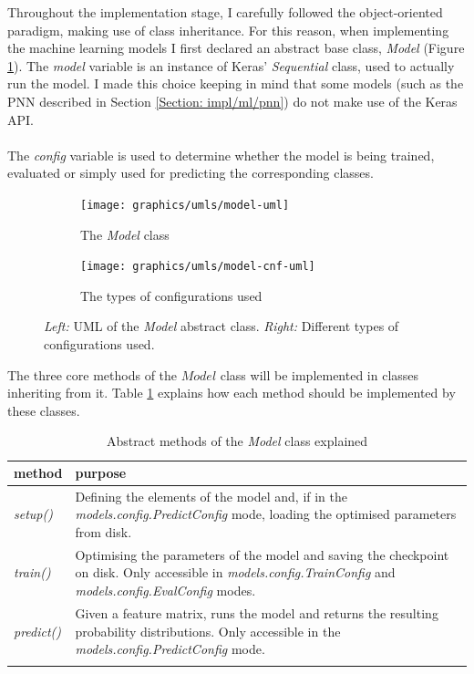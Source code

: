	Throughout the implementation stage, I carefully followed the object-oriented paradigm, making use of class inheritance. For this reason, when implementing the machine learning models I first declared an abstract base class, \textit{Model} (Figure \ref{Fig: impl/ml/model/uml/model}). The \textit{model} variable is an instance of Keras' \textit{Sequential} class, used to actually run the model. I made this choice keeping in mind that some models (such as the PNN described in Section \ref{Section: impl/ml/pnn}) do not make use of the Keras API. 
	\\ \\
	The \textit{config} variable is used to determine whether the model is being trained, evaluated or simply used for predicting the corresponding classes.
	\begin{figure}[H]
		\centering
		\begin{subfigure}[b]{.3\textwidth}
			\texttt{[image: graphics/umls/model-uml]}
			\caption{The \textit{Model} class}
			\label{Fig: impl/ml/model/uml/model}
			\hspace{1pt}
		\end{subfigure}\hfill
		\begin{subfigure}[b]{.55\textwidth}
			\texttt{[image: graphics/umls/model-cnf-uml]}
			\caption{The types of configurations used}
			\label{Fig: impl/ml/model/uml/configs}
		\end{subfigure}
		\caption{\textit{Left:} UML of the \textit{Model} abstract class. \textit{Right:} Different types of configurations used.}
		\label{Fig: impl/ml/model/uml}
	\end{figure}
	The three core methods of the $Model$ class will be implemented in classes inheriting from it. Table \ref{Table: impl/ml/model/purpose} explains how each method should be implemented by these classes.
	\begin{longtable}{p{}p{}}
		\textbf{method} & \textbf{purpose} \\
		\hline
		\textit{setup()} & Defining the elements of the model and, if in the \textit{models.config.PredictConfig} mode, loading the optimised parameters from disk. \\
		\hline
		\textit{train()} & Optimising the parameters of the model and saving the checkpoint on disk. Only accessible in \textit{models.config.TrainConfig} and \textit{models.config.EvalConfig} modes. \\
		\hline
		\textit{predict()} & Given a feature matrix, runs the model and returns the resulting probability distributions. Only accessible in the \textit{models.config.PredictConfig} mode.\\
		\hline
		\caption{Abstract methods of the \textit{Model} class explained}
		\label{Table: impl/ml/model/purpose}
	\end{longtable}

